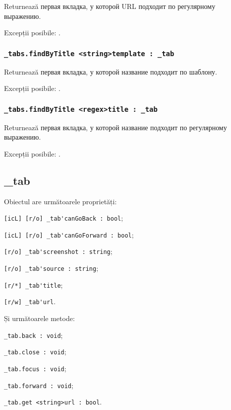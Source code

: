 Returnează первая вкладка, у которой URL подходит по регулярному выражению.

Excepții posibile: .

\subsubsection{\lstinline|_tabs.findByTitle <string>template : _tab|}

Returnează первая вкладка, у которой название подходит по шаблону.

Excepții posibile: .

\subsubsection{\lstinline|_tabs.findByTitle <regex>title : _tab|}

Returnează первая вкладка, у которой название подходит по регулярному выражению.

Excepții posibile: .

\subsection{{\color{orange} \_tab}}

Obiectul \tab{} are următoarele proprietăți:
\begin{icItems}
	\item \lstinline|[icL] [r/o] _tab'canGoBack : bool|;
	\item \lstinline|[icL] [r/o] _tab'canGoForward : bool|;
	\item \lstinline|[r/o] _tab'screenshot : string|;
	\item \lstinline|[r/o] _tab'source : string|;
	\item \lstinline|[r/*] _tab'title|;
	\item \lstinline|[r/w] _tab'url|.
\end{icItems}

Și următoarele metode:
\begin{icItems}
	\item \lstinline|_tab.back : void|;
	\item \lstinline|_tab.close : void|;
	\item \lstinline|_tab.focus : void|;
	\item \lstinline|_tab.forward : void|;
	\item \lstinline|_tab.get <string>url : bool|.
\end{icItems}

